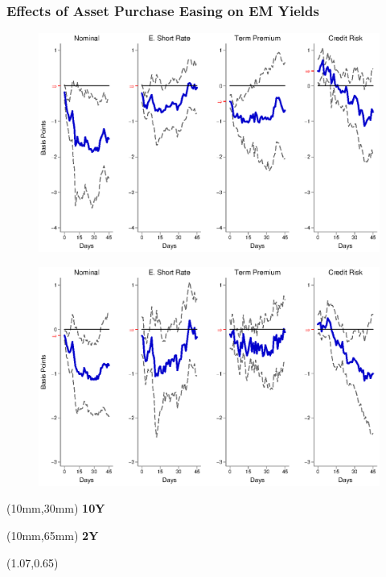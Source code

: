 \documentclass[12pt, aspectratio=169, xcolor=dvipsnames]{beamer}
\begin{document}


\begin{frame}[label=LSAPEM]
\frametitle{Effects of Asset Purchase Easing on EM Yields}
\begin{figure}[!htbp]
\begin{center} %
\includegraphics[trim={0cm 0cm 0cm 0cm},clip,height=0.45\textheight,width=0.85\linewidth]{../Figures/LPs/LagDep-FX/LSAP/EM/LSAPEMnomyptpphi120m.eps}
\par\end{center}
\end{figure}
\vspace{-0.5cm}
\begin{figure}[!htbp]
\begin{center} %
\includegraphics[trim={0cm 0cm 0cm 0.76cm},clip,height=0.45\textheight,width=0.85\linewidth]{../Figures/LPs/LagDep-FX/LSAP/EM/LSAPEMnomyptpphi24m.eps}
\par\end{center}
\end{figure}
\begin{textblock*}{8mm}(10mm,30mm)
\small \textbf{10Y}
\end{textblock*}
\begin{textblock*}{8mm}(10mm,65mm)
\small \textbf{2Y}
\end{textblock*}
\begin{textblock*}{5cm}(1.07\textwidth,0.65\textheight)
\hyperlink{LSAPUS}{}
\end{textblock*}
\end{frame}
\end{document}
